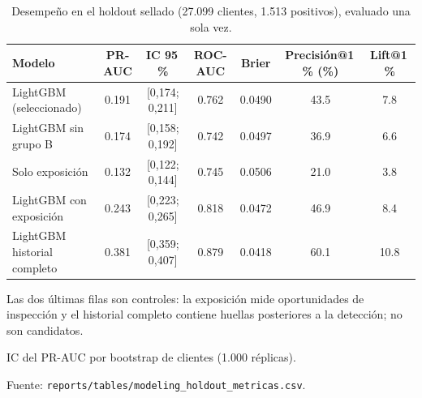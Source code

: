 \begin{table}[htbp]
  \centering
  \small
  \caption{Desempeño en el holdout sellado (27.099 clientes, 1.513 positivos), evaluado una sola vez.}
  \label{tab:holdout}
  \begin{threeparttable}
    \begin{tabular}{l S[table-format=1.3] c S[table-format=1.3] S[table-format=1.4] S[table-format=2.1] S[table-format=2.1]}
      \toprule
      {Modelo} & {PR-AUC} & {IC 95\,\%} & {ROC-AUC} & {Brier} & {Precisión@1\,\% (\%)} & {Lift@1\,\%} \\
      \midrule
      LightGBM (seleccionado) & 0.191 & {[0,174; 0,211]} & 0.762 & 0.0490 & 43.5 & 7.8 \\
      LightGBM sin grupo B & 0.174 & {[0,158; 0,192]} & 0.742 & 0.0497 & 36.9 & 6.6 \\
      Solo exposición & 0.132 & {[0,122; 0,144]} & 0.745 & 0.0506 & 21.0 & 3.8 \\
      LightGBM con exposición & 0.243 & {[0,223; 0,265]} & 0.818 & 0.0472 & 46.9 & 8.4 \\
      LightGBM historial completo & 0.381 & {[0,359; 0,407]} & 0.879 & 0.0418 & 60.1 & 10.8 \\
      \bottomrule
    \end{tabular}
    \begin{tablenotes}
      \footnotesize
      \item Las dos últimas filas son controles: la exposición mide oportunidades de inspección y el historial completo contiene huellas posteriores a la detección; no son candidatos.
      \item IC del PR-AUC por bootstrap de clientes (1.000 réplicas).
      \item Fuente: \texttt{reports/tables/modeling\_holdout\_metricas.csv}.
    \end{tablenotes}
  \end{threeparttable}
\end{table}
